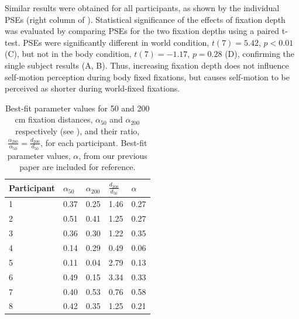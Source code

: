 Similar results were obtained for all participants, as shown by the individual PSEs (right column of ). Statistical significance of the effects of fixation depth was evaluated by comparing PSEs for the two fixation depths using a paired t-test. PSEs were significantly different in world condition, $t(7) = 5.42$, $p < 0.01$ (C), but not in the body condition, $t(7) = -1.17$, $p = 0.28$ (D), confirming the single subject results (A, B). Thus, increasing fixation depth does not influence self-motion perception during body fixed fixations, but causes self-motion to be perceived as shorter during world-fixed fixations.

\begin{table}
    \begin{tabular}{l|lll|l}
	Participant & $\alpha_{50}$ & $\alpha_{200}$ & $\frac{d_{200}}{d_{50}}$ & $\alpha$ \\
    \hline
	1 & 0.37 & 0.25 & 1.46 & 0.27 \\
	2 & 0.51 & 0.41 & 1.25 & 0.27 \\
	3 & 0.36 & 0.30 & 1.22 & 0.35 \\
	4 & 0.14 & 0.29 & 0.49 & 0.06 \\
	5 & 0.11 & 0.04 & 2.79 & 0.13 \\
	6 & 0.49 & 0.15 & 3.34 & 0.33\\
	7 & 0.40 & 0.53 & 0.76 & 0.58 \\
	8 & 0.42 & 0.35 & 1.25 & 0.21 \\
    \end{tabular}

    \caption{Best-fit parameter values for 50 and 200 \si{\centi\metre} fixation distances, $\alpha_{50}$ and $\alpha_{200}$ respectively (see ), and their ratio, $\frac{\alpha_{200}}{\alpha_{50}} = \frac{d_{200}}{d_{50}}$, for each participant. Best-fit parameter values, $\alpha$, from our previous paper \protect\cite{clemens2015a} are included for reference.}

    \label{p4:tab2}
\end{table}

